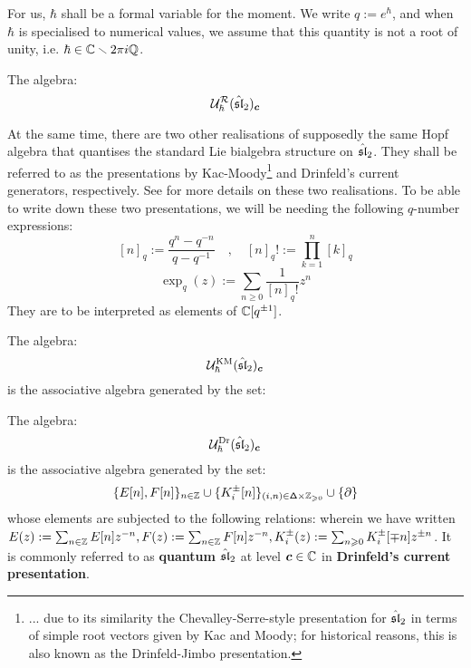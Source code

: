         For us, $\hbar$ shall be a formal variable for the moment. We write $q := e^{\hbar}$, and when $\hbar$ is specialised to numerical values, we assume that this quantity is not a root of unity, i.e. $\hbar \in \bbC \setminus 2\pi i \Q$.
        
        \begin{definition} \label{def: quantum_affine_sl_2_R_matrix_presentation}
            The algebra:
                $$\calU_{\hbar}^{\calR}(\hat{\sl}_2)_{\level}$$
        \end{definition}

        At the same time, there are two other realisations of supposedly the same Hopf algebra that quantises the standard Lie bialgebra structure on $\hat{\sl}_2$. They shall be referred to as the presentations by Kac-Moody\footnote{... due to its similarity the Chevalley-Serre-style presentation for $\hat{\sl}_2$ in terms of simple root vectors given by Kac and Moody; for historical reasons, this is also known as the Drinfeld-Jimbo presentation.} and Drinfeld's current generators, respectively. See \cite[Subsection 2.1]{ding_pakuliak_khoroshkin_factorisation_of_the_R_matrix_of_quantum_affine_sl_2} for more details on these two realisations. To be able to write down these two presentations, we will be needing the following $q$-number expressions:
            $$[n]_q := \frac{q^n - q^{-n}}{q - q^{-1}} \quad, \quad [n]_q! := \prod_{k = 1}^n [k]_q$$
                $$\exp_q(z) := \sum_{n \geq 0} \frac{1}{[n]_q!} z^n$$
        They are to be interpreted as elements of $\bbC[q^{\pm 1}]$.
        \begin{definition} \label{def: quantum_affine_sl_2_kac_moody_presentation}
            The algebra:
                $$\calU_{\hbar}^{\KM}(\hat{\sl}_2)_{\level}$$
            is the associative algebra generated by the set:
                $$$$
        \end{definition}
        \begin{definition} \label{def: quantum_affine_sl_2_drinfeld_current_presentation}
            The algebra:
                $$\calU_{\hbar}^{\current}(\hat{\sl}_2)_{\level}$$
            is the associative algebra generated by the set:
                $$\{ E[n], F[n] \}_{n \in \Z} \cup \{ K_i^{\pm}[n] \}_{(i, n) \in \simpleroots \x \Z_{\geq 0}} \cup \{ \del \}$$
            whose elements are subjected to the following relations:
            wherein we have written $E(z) := \sum_{n \in \Z} E[n] z^{-n}, F(z) := \sum_{n \in \Z} F[n] z^{-n}, K_i^{\pm}(z) := \sum_{n \geq 0} K_i^{\pm}[\mp n] z^{\pm n}$. It is commonly referred to as \textbf{quantum $\hat{\sl}_2$} at level $\level \in \bbC$ in \textbf{Drinfeld's current presentation}.
        \end{definition}

